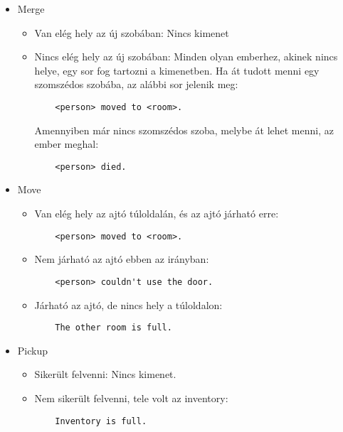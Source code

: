 \begin{itemize}
    \item Merge
    \begin{itemize}
        \item Van elég hely az új szobában: Nincs kimenet
        \item Nincs elég hely az új szobában: Minden olyan emberhez, akinek nincs helye, egy sor fog tartozni a kimenetben. Ha át tudott menni egy szomszédos szobába, az alábbi sor jelenik meg:
        \begin{verbatim}
    <person> moved to <room>.
        \end{verbatim}
        Amennyiben már nincs szomszédos szoba, melybe át lehet menni, az ember meghal:
        \begin{verbatim}
    <person> died.
        \end{verbatim}
    \end{itemize}

    \item Move
    \begin{itemize}
        \item Van elég hely az ajtó túloldalán, és az ajtó járható erre:
        \begin{verbatim}
    <person> moved to <room>.
        \end{verbatim}
        \item Nem járható az ajtó ebben az irányban:
        \begin{verbatim}
    <person> couldn't use the door.
        \end{verbatim}
        \item Járható az ajtó, de nincs hely a túloldalon:
        \begin{verbatim}
    The other room is full.
        \end{verbatim}
    \end{itemize}

    \item Pickup
    \begin{itemize}
        \item Sikerült felvenni: Nincs kimenet.
        \item Nem sikerült felvenni, tele volt az inventory:
        \begin{verbatim}
    Inventory is full.
        \end{verbatim}
    \end{itemize}


\end{itemize}
